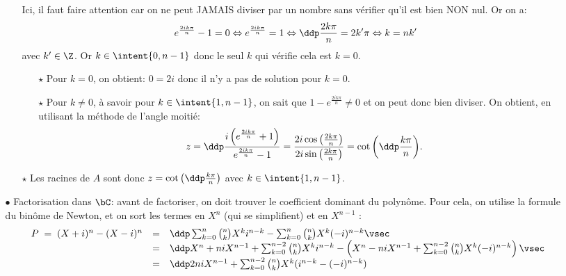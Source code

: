 \documentclass[a4paper, 11pt,reqno]{article}
\begin{document}
\begin{correction}
\begin{enumerate}
\begin{itemize}
\begin{itemize}
				                  Ici, il faut faire attention car on ne peut JAMAIS diviser par un nombre sans v\'erifier qu'il est bien NON nul. Or on a:
				                  $$e^{\frac{2ik\pi}{n}} -1=0\Leftrightarrow e^{\frac{2ik\pi}{n}} =1\Leftrightarrow \ddp\frac{2k\pi}{n}=2k^{\prime}\pi\Leftrightarrow k=nk^{\prime}$$
				                  avec $k^{\prime}\in\Z$. Or $k\in\intent{ 0,n-1}$ donc le seul $k$ qui v\'erifie cela est $k=0$.
				                  \begin{itemize}
					                  \item[$\star$] Pour $k=0$, on obtient: $0=2i$ donc il n'y a pas de solution pour $k=0$.
					                  \item[$\star$] Pour $k\not= 0$, \`{a} savoir pour $k\in\intent{ 1,n-1}$, on sait que $1- e^{\frac{2ik\pi}{n}}\not= 0$ et on peut donc bien diviser. On obtient, en utilisant la m\'ethode de l'angle moiti\'e:
					                        $$z=\ddp\frac{i\left(e^{\frac{2ik\pi}{n}}+1\right)}{e^{\frac{2ik\pi}{n}} -1}=\frac{2i \cos\left(\frac{2k\pi}{n}\right)}{2i \sin\left(\frac{2k\pi}{n}\right)}= \cot{\left( \ddp\frac{k\pi}{n} \right)}.$$
				                  \end{itemize}
				            \item[$\star$] Les racines de $A$ sont donc $z=\cot{\left( \ddp\frac{k\pi}{n} \right)} $ avec $k\in\intent{ 1,n-1}$. %
			            \end{itemize}
			      \item[$\bullet$] Factorisation dans $\bC$: avant de factoriser, on doit trouver le coefficient dominant du polyn\^ome. Pour cela, on utilise la formule du bin\^ome de Newton, et on sort les termes en $X^n$ (qui se simplifient) et en $X^{n-1}$ :
			            $$\begin{array}{rcl}
					            P \; = \; (X+i)^n - (X-i)^n & = & \ddp \sum_{k=0}^n \binom{n}{k} X^k i^{n-k} - \sum_{k=0}^n \binom{n}{k} X^k (-i)^{n-k} \vsec                                                             \\
					                                        & = & \ddp X^n +n i X^{n-1} + \sum_{k=0}^{n-2} \binom{n}{k} X^k i^{n-k} - \left( X^n - ni X^{n-1} + \sum_{k=0}^{n-2} \binom{n}{k} X^k (-i)^{n-k} \right)\vsec \\
					                                        & = & \ddp 2ni X^{n-1} +  \sum_{k=0}^{n-2} \binom{n}{k} X^k (i^{n-k}-(-i)^{n-k})
				            \end{array}$$

\end{itemize}
\end{enumerate}
\end{correction}
\end{document}
